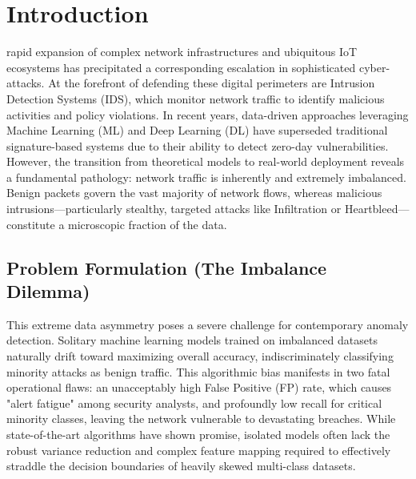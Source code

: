 \section{Introduction}
 rapid expansion of complex network infrastructures and ubiquitous IoT ecosystems has precipitated a corresponding escalation in sophisticated cyber-attacks. At the forefront of defending these digital perimeters are Intrusion Detection Systems (IDS), which monitor network traffic to identify malicious activities and policy violations. In recent years, data-driven approaches leveraging Machine Learning (ML) and Deep Learning (DL) have superseded traditional signature-based systems due to their ability to detect zero-day vulnerabilities. However, the transition from theoretical models to real-world deployment reveals a fundamental pathology: network traffic is inherently and extremely imbalanced. Benign packets govern the vast majority of network flows, whereas malicious intrusions—particularly stealthy, targeted attacks like Infiltration or Heartbleed—constitute a microscopic fraction of the data. 

\subsection{Problem Formulation (The Imbalance Dilemma)}
This extreme data asymmetry poses a severe challenge for contemporary anomaly detection. Solitary machine learning models trained on imbalanced datasets naturally drift toward maximizing overall accuracy, indiscriminately classifying minority attacks as benign traffic. This algorithmic bias manifests in two fatal operational flaws: an unacceptably high False Positive (FP) rate, which causes "alert fatigue" among security analysts, and profoundly low recall for critical minority classes, leaving the network vulnerable to devastating breaches. While state-of-the-art algorithms have shown promise, isolated models often lack the robust variance reduction and complex feature mapping required to effectively straddle the decision boundaries of heavily skewed multi-class datasets.

